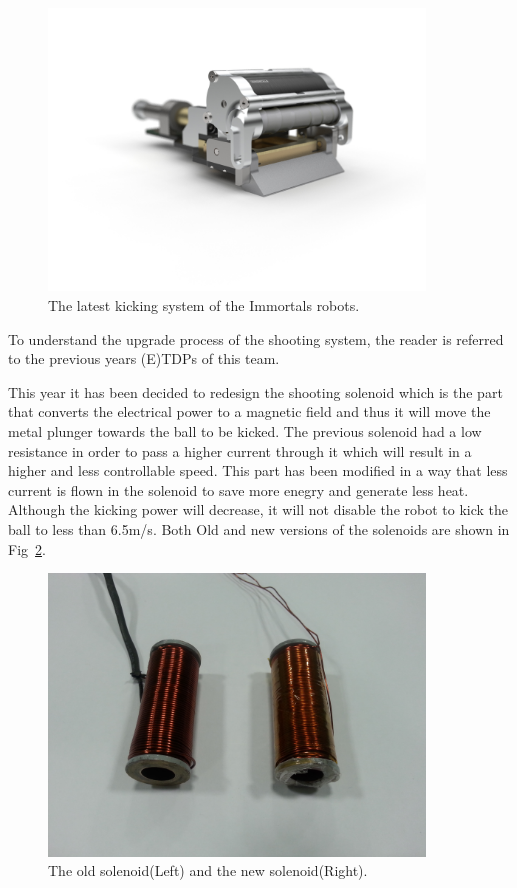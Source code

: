 \documentclass[runningheads]{llncs}
\begin{document}
\begin{figure}
\centering
\includegraphics[width=10cm]{images/kicking_system.jpg}
\caption{The latest kicking system of the Immortals robots.} \label{fig_Kick_Sys}
\end{figure}

To understand the upgrade process of the shooting system, the reader is referred to the previous years (E)TDPs of this team.

This year it has been decided to redesign the shooting solenoid which is the part that converts the electrical power to a magnetic field and thus it will move the metal plunger towards the ball to be kicked. The previous solenoid had a low resistance in order to pass a higher current through it which will result in a higher and less controllable speed. This part has been modified in a way that less current is flown in the solenoid to save more enegry and generate less heat. Although the kicking power will decrease, it will not disable the robot to kick the ball to less than 6.5m/s. Both Old and new versions of the solenoids are shown in Fig~\ref{fig_solenoid}.

\begin{figure}
\centering
\includegraphics[width=10cm]{images/solenoid.jpg}
\caption{The old solenoid(Left) and the new solenoid(Right).} \label{fig_solenoid}
\end{figure}
\end{document}
